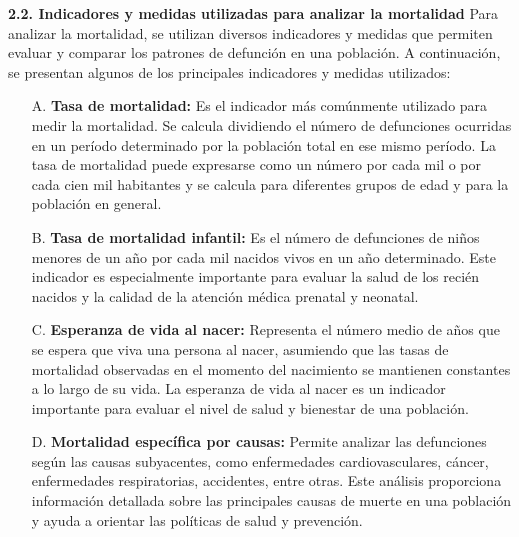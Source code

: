 \documentclass[8pt,a4paper]{beamer}
\begin{document}
{\begin{frame}{}
\begin{block}{\textbf{2.2. Indicadores y medidas utilizadas para analizar la mortalidad}}
\setlength{\parskip}{2px}
\justifying
Para analizar la mortalidad, se utilizan diversos indicadores y medidas que permiten evaluar y comparar los patrones de defunción en una población. A continuación, se presentan algunos de los principales indicadores y medidas utilizados:
\begin{enumerate}
\setlength{\parskip}{2px}
\justifying
\item[A.] \textbf{Tasa de mortalidad:} Es el indicador más comúnmente utilizado para medir la mortalidad. Se calcula dividiendo el número de defunciones ocurridas en un período determinado por la población total en ese mismo período. La tasa de mortalidad puede expresarse como un número por cada mil o por cada cien mil habitantes y se calcula para diferentes grupos de edad y para la población en general.

\item[B.] \textbf{Tasa de mortalidad infantil:} Es el número de defunciones de niños menores de un año por cada mil nacidos vivos en un año determinado. Este indicador es especialmente importante para evaluar la salud de los recién nacidos y la calidad de la atención médica prenatal y neonatal.

\item[C.] \textbf{Esperanza de vida al nacer:} Representa el número medio de años que se espera que viva una persona al nacer, asumiendo que las tasas de mortalidad observadas en el momento del nacimiento se mantienen constantes a lo largo de su vida. La esperanza de vida al nacer es un indicador importante para evaluar el nivel de salud y bienestar de una población.
\end{enumerate}
\end{block}
\end{frame}

\begin{frame}{}
\begin{block}{}
\setlength{\parskip}{3px}
\justifying
\begin{enumerate}
\setlength{\parskip}{3px}
\justifying
\item[D.] \textbf{Mortalidad específica por causas:} Permite analizar las defunciones según las causas subyacentes, como enfermedades cardiovasculares, cáncer, enfermedades respiratorias, accidentes, entre otras. Este análisis proporciona información detallada sobre las principales causas de muerte en una población y ayuda a orientar las políticas de salud y prevención.


\end{enumerate}
\end{block}
\end{frame}}
\end{document}
